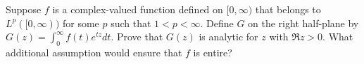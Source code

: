 Suppose $f$ is a complex-valued function defined on $[0,\infty)$ that
belongs to $L^p([0,\infty))$ for some $p$ such that
$1<p<\infty$. Define $G$ on the right half-plane by
$G(z)=\int_0^{\infty}f(t) e^{tz} dt$. Prove that $G(z)$ is analytic
for $z$ with $\Re z>0$. What additional assumption would ensure that
$f$ is entire?

